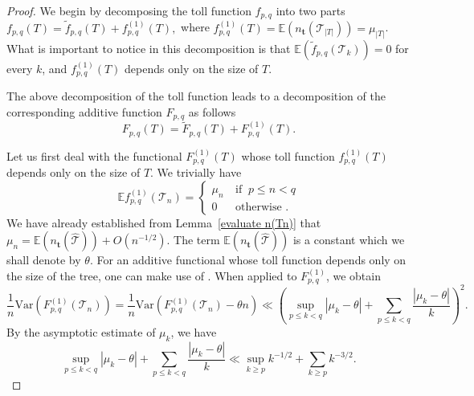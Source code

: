 \documentclass[article]{amsart}
\newcommand{\Var} {\mathrm {Var}}
\newcommand{\tc}{\mathcal{T}}
\newcommand{\htc}{\hat{\tc}}
\newcommand{\st}{\textbf{t}}
\newcommand{\n}{n_{\st}}
\newcommand{\hf}{\tilde{f}_{p,q}}
\newcommand{\hF}{\tilde{F}_{p,q}}
\newcommand{\E}{\mathbb{E}}
\theoremstyle{definition}
\theoremstyle{remark}
\begin{document}
\begin{proof}
We begin by decomposing the toll function $f_{p,q}$ into two parts 
$
f_{p,q}(T)=\hf(T)+ f_{p,q}^{(1)}(T),
$ where $f_{p,q}^{(1)}(T)=\E(\n(\tc_{|T|}))=\mu_{|T|}$. What is important to notice in this decomposition is that $\E(\hf (\tc_k))=0$ for every $k$, and $f_{p,q}^{(1)}(T)$ depends only on the size of $T$.   

 The above decomposition of the toll function leads to a decomposition of the corresponding additive function $F_{p,q}$ as follows 
\[
F_{p,q}(T)=\hF{(T)}+F_{p,q}^{(1)}(T).
\]

Let us first deal with the functional $F_{p,q}^{(1)}(T)$ whose toll function $f_{p,q}^{(1)}(T)$ depends only on the size of $T$. We trivially have 
\[
\E f_{p,q}^{(1)}(\tc_n)=
\begin{cases}
    \mu_n \ &\text{if }\ p\le n<q\\
    0 \ &\text{otherwise }.
\end{cases}
\]
We have already established from Lemma~\ref{evaluate n(Tn)} that $\mu_n=\E(\n(\htc))+O(n^{-1/2})$. The term $\E(\n(\htc))$  is a constant which we shall denote by $\theta$. For an additive functional whose toll function depends only on the size of the tree, one can make use of \cite[Theorem 6.7]{J16}. When applied to $F_{p,q}^{(1)}$, we obtain 
\begin{equation}\label{eq:varp1}
    \frac{1}{n}\Var(F_{p,q}^{(1)}(\tc_n))=\frac{1}{n}\Var\left(F_{p,q}^{(1)}(\tc_n)-\theta n\right)\ll \left(\sup_{p \leq k<q}|\mu_k-\theta|+\sum_{p\le k<q}\frac{|\mu_k-\theta|}{k}\right)^2.
\end{equation}
By the asymptotic estimate of $\mu_k$, we have 
\begin{equation}\label{eq:varp2}
    \sup_{p \leq k<q}|\mu_k-\theta|+\sum_{p\le k<q}\frac{|\mu_k-\theta|}{k}\ll \sup_{k\geq p}k^{-1/2}+\sum_{k\geq p}k^{-3/2}.
\end{equation}




\end{proof}
\end{document}

